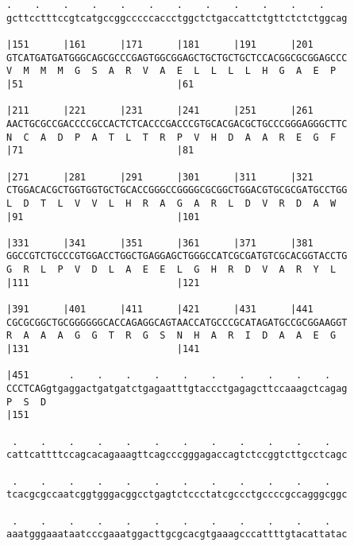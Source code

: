 \documentclass{article}
\begin{document}
\begin{Verbatim}
.    .    .    .    .    .    .    .    .    .    .    .    
gcttcctttccgtcatgccggcccccaccctggctctgaccattctgttctctctggcag
                                                            
|151      |161      |171      |181      |191      |201      
GTCATGATGATGGGCAGCGCCCGAGTGGCGGAGCTGCTGCTGCTCCACGGCGCGGAGCCC
V  M  M  M  G  S  A  R  V  A  E  L  L  L  L  H  G  A  E  P  
|51                           |61                           
  
|211      |221      |231      |241      |251      |261      
AACTGCGCCGACCCCGCCACTCTCACCCGACCCGTGCACGACGCTGCCCGGGAGGGCTTC
N  C  A  D  P  A  T  L  T  R  P  V  H  D  A  A  R  E  G  F  
|71                           |81                           
  
|271      |281      |291      |301      |311      |321      
CTGGACACGCTGGTGGTGCTGCACCGGGCCGGGGCGCGGCTGGACGTGCGCGATGCCTGG
L  D  T  L  V  V  L  H  R  A  G  A  R  L  D  V  R  D  A  W  
|91                           |101                          
  
|331      |341      |351      |361      |371      |381      
GGCCGTCTGCCCGTGGACCTGGCTGAGGAGCTGGGCCATCGCGATGTCGCACGGTACCTG
G  R  L  P  V  D  L  A  E  E  L  G  H  R  D  V  A  R  Y  L  
|111                          |121                          
  
|391      |401      |411      |421      |431      |441      
CGCGCGGCTGCGGGGGGCACCAGAGGCAGTAACCATGCCCGCATAGATGCCGCGGAAGGT
R  A  A  A  G  G  T  R  G  S  N  H  A  R  I  D  A  A  E  G  
|131                          |141                          
  
|451       .    .    .    .    .    .    .    .    .    .   
CCCTCAGgtgaggactgatgatctgagaatttgtaccctgagagcttccaaagctcagag
P  S  D                                                     
|151                                                        
  
 .    .    .    .    .    .    .    .    .    .    .    .   
cattcattttccagcacagaaagttcagcccgggagaccagtctccggtcttgcctcagc
                                                            
 .    .    .    .    .    .    .    .    .    .    .    .   
tcacgcgccaatcggtgggacggcctgagtctccctatcgccctgccccgccagggcggc
                                                            
 .    .    .    .    .    .    .    .    .    .    .    .   
aaatgggaaataatcccgaaatggacttgcgcacgtgaaagcccattttgtacattatac
                                                            

\end{Verbatim}
\end{document}

